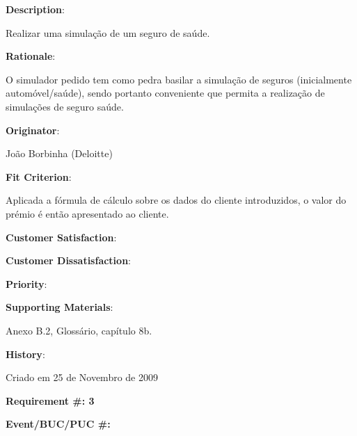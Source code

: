 \begin{description}
\item \textbf{Description}:

Realizar uma simulação de um seguro de saúde.\\

\item \textbf{Rationale}:

O simulador pedido tem como pedra basilar a simulação de seguros (inicialmente automóvel/saúde), sendo portanto conveniente que permita a realização de simulações de seguro saúde.\\

\item \textbf{Originator}:

João Borbinha (Deloitte)\\

\item \textbf{Fit Criterion}:

Aplicada a fórmula de cálculo sobre os dados do cliente introduzidos, o valor do prémio é então apresentado ao cliente.\\

\begin{minipage}{0.45\textwidth}
\begin{flushleft}\item \textbf{Customer Satisfaction}:\end{flushleft}
\end{minipage}
\begin{minipage}{0.45\textwidth}
\begin{flushleft}\item \textbf{Customer Dissatisfaction}:\end{flushleft}
\end{minipage}

\item \textbf{Priority}:\\

\item \textbf{Supporting Materials}:

Anexo B.2, Glossário, capítulo 8b.\\

\item \textbf{History}:

Criado em 25 de Novembro de 2009\\
\end{description}

\pagebreak

\begin{minipage}{0.55\textwidth}
\begin{flushleft}\textbf{Requirement \#: 3}\end{flushleft}
\end{minipage}
\begin{minipage}{0.4\textwidth}
\begin{flushright}\textbf{Event/BUC/PUC \#:}\end{flushright}
\end{minipage}

